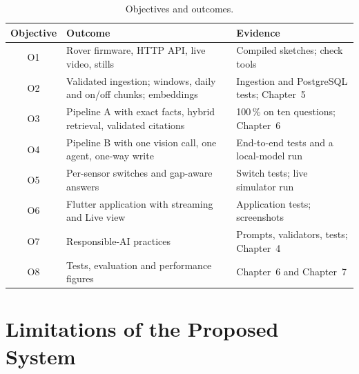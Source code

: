\begin{table}[H]
\centering
\caption{Objectives and outcomes.}
\label{tab:objectives}
\small
\begin{tabular}{|c|P{6.1cm}|P{5.2cm}|}
\hline
\textbf{Objective} & \textbf{Outcome} & \textbf{Evidence}\\\hline
O1 & Rover firmware, HTTP API, live video, stills & Compiled sketches; check tools\\\hline
O2 & Validated ingestion; windows, daily and on/off chunks; embeddings & Ingestion and PostgreSQL tests; Chapter~5\\\hline
O3 & Pipeline A with exact facts, hybrid retrieval, validated citations & 100\,\% on ten questions; Chapter~6\\\hline
O4 & Pipeline B with one vision call, one agent, one-way write & End-to-end tests and a local-model run\\\hline
O5 & Per-sensor switches and gap-aware answers & Switch tests; live simulator run\\\hline
O6 & Flutter application with streaming and Live view & Application tests; screenshots\\\hline
O7 & Responsible-AI practices & Prompts, validators, tests; Chapter~4\\\hline
O8 & Tests, evaluation and performance figures & Chapter~6 and Chapter~7\\\hline
\end{tabular}
\end{table}

\section{Limitations of the Proposed System}

